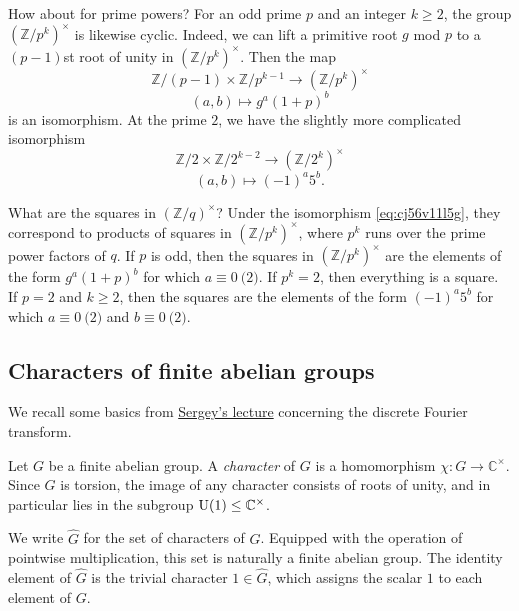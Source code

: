 \documentclass[reqno]{amsart}  \numberwithin{theorem}{section} \numberwithin{equation}{section}
\begin{document}
How about for prime powers?  For an odd prime $p$ and an integer $k \geq 2$, the group $(\mathbb{Z} / p^k )^\times$ is likewise cyclic.  Indeed, we can lift a primitive root $g$ mod $p$ to a $(p-1)$st root of unity in $(\mathbb{Z} / p^k)^\times$.  Then the map
\begin{equation}\label{eq:cj56v1ftv0}
  \mathbb{Z} / (p-1) \times \mathbb{Z} / p^{k-1}  \rightarrow (\mathbb{Z} / p^k )^\times 
\end{equation}
\begin{equation*}
  (a,b) \mapsto g^a (1 + p)^b
\end{equation*}
is an isomorphism.  At the prime $2$, we have the slightly more complicated isomorphism
\label{sec:cj56v1kjb7}\begin{equation}
  \mathbb{Z} / 2 \times \mathbb{Z} / 2^{k - 2} \rightarrow (\mathbb{Z} / 2^k )^\times 
\end{equation}
\begin{equation*}
  (a, b) \mapsto (-1)^a 5^b.
\end{equation*}

\begin{example}\label{example:cj57ckfyti}
  What are the squares in $(\mathbb{Z} / q)^\times$?  Under the isomorphism \eqref{eq:cj56v11l5g}, they correspond to products of squares in $(\mathbb{Z} / p^k)^\times$, where $p^k$ runs over the prime power factors of $q$.  If $p$ is odd, then the squares in $(\mathbb{Z} / p^k )^\times$ are the elements of the form $g^a (1 + p)^b $ for which $a \equiv 0 \pod{2}$.  If $p^k = 2$, then everything is a square.  If $p = 2$ and $k \geq 2$, then the squares are the elements of the form $(-1)^a 5^b$ for which $a \equiv 0 \pod{2}$ and $b \equiv 0 \pod{2}$.
\end{example}


\subsection{Characters of finite abelian groups}\label{sec:cj56v04up0}
We recall some basics from \href{20230919T144827--discrete-fourier-transform.pdf}{Sergey's lecture} concerning the discrete Fourier transform.

Let $G$ be a finite abelian group.  A \emph{character} of $G$ is a homomorphism $\chi : G \rightarrow \mathbb{C}^\times$.  Since $G$ is torsion, the image of any character consists of roots of unity, and in particular lies in the subgroup $\operatorname{U}(1) \leq \mathbb{C}^\times$.

We write $\hat{G}$ for the set of characters of $G$.  Equipped with the operation of pointwise multiplication, this set is naturally a finite abelian group.  The identity element of $\hat{G}$ is the trivial character $1 \in \hat{G}$, which assigns the scalar $1$ to each element of $G$.
\end{document}
